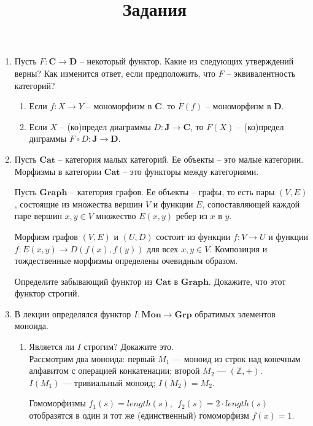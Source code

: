 \documentclass[draft]{article}
\newcommand{\cat}[1]{\mathbf{#1}}
\renewcommand{\C}{\cat{C}}
\newcommand{\D}{\cat{D}}
\newcommand{\Mon}{\cat{Mon}}
\newcommand{\Grp}{\cat{Grp}}
\begin{document}
\title{Задания}
\maketitle

\begin{enumerate}

\item Пусть $F : \C \to \D$ -- некоторый функтор.
Какие из следующих утверждений верны?
Как изменится ответ, если предположить, что $F$ -- эквивалентность категорий?
\begin{enumerate}
\item Если $f : X \to Y$ -- мономорфизм в $\C$. то $F(f)$ -- мономорфизм в $\D$.
\item Если $X$ -- (ко)предел диаграммы $D : \cat{J} \to \C$, то $F(X)$ -- (ко)предел диграммы $F \circ D : \cat{J} \to \D$.
\end{enumerate}

\item Пусть $\cat{Cat}$ -- категория малых категорий.
Ее объекты -- это малые категории.
Морфизмы в категории $\cat{Cat}$ -- это функторы между категориями.

Пусть $\cat{Graph}$ -- категория графов.
Ее объекты -- графы, то есть пары $(V,E)$, состоящие из множества вершин $V$ и функции $E$, сопоставляющей каждой паре вершин $x,y \in V$ множество $E(x,y)$ ребер из $x$ в $y$.

Морфизм графов $(V,E)$ и $(U,D)$ состоит из функции $f : V \to U$ и функции $f : E(x,y) \to D(f(x), f(y))$ для всех $x,y \in V$.
Композиция и тождественные морфизмы определены очевидным образом.

Определите забывающий функтор из $\cat{Cat}$ в $\cat{Graph}$.
Докажите, что этот функтор строгий.

\item В лекции определялся функтор $I : \Mon \to \Grp$ обратимых элементов моноида.
\begin{enumerate}
\item Является ли $I$ строгим? Докажите это.\\
Рассмотрим два моноида: первый $M_1$ --- моноид из строк над конечным алфавитом с операцией конкатенации; второй $M_2$ --- $(\mathbb{Z}, +)$.\\

$I(M_1)$ --- тривиальный моноид; $I(M_2) = M_2$.

Гомоморфизмы $f_1(s) = length(s),~~f_2(s) = 2\cdot length(s)$ отобразятся в один и тот же (единственный) гомоморфизм $f(x) = 1$.


\end{enumerate}
\end{enumerate}
\end{document}
